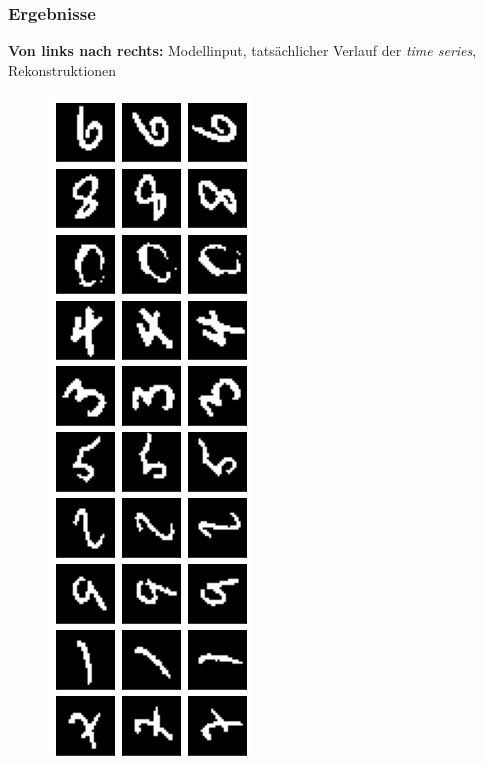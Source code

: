 \begin{frame}
\frametitle{Ergebnisse}
\textbf{Von links nach rechts:} Modellinput, tatsächlicher Verlauf der \emph{time series}, Rekonstruktionen 
\begin{figure}[h!]
	\begin{minipage}{0.135\textwidth}
			\center{}
			\includegraphics[scale=0.19]{Bilder/MNISTorig1}
	\end{minipage}
	\begin{minipage}{0.33\textwidth}
			\center{}

\end{minipage}
\end{figure}
\end{frame}
